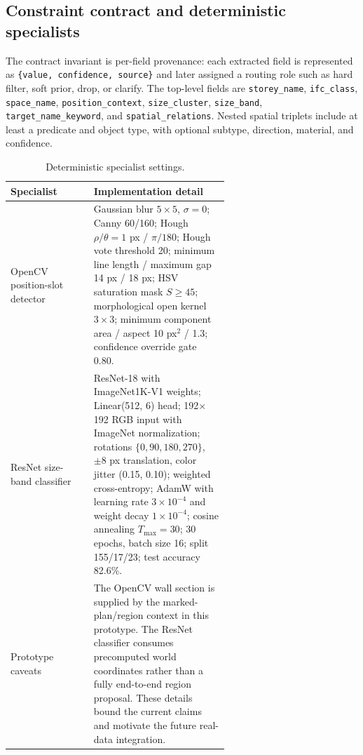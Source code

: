 \subsection{Constraint contract and deterministic specialists}
\label{app:contract}

The contract invariant is per-field provenance: each extracted field is represented as \texttt{\{value, confidence, source\}} and later assigned a routing role such as hard filter, soft prior, drop, or clarify. The top-level fields are \texttt{storey\_name}, \texttt{ifc\_class}, \texttt{space\_name}, \texttt{position\_context}, \texttt{size\_cluster}, \texttt{size\_band}, \texttt{target\_name\_keyword}, and \texttt{spatial\_relations}. Nested spatial triplets include at least a predicate and object type, with optional subtype, direction, material, and confidence.

\begin{table}[ht]
  \centering
  \small
  \begin{tabular}{lp{0.62\linewidth}}
    \toprule
    Specialist & Implementation detail \\
    \midrule
    OpenCV position-slot detector & Gaussian blur $5\times5$, $\sigma=0$; Canny 60/160; Hough $\rho/\theta=1$ px / $\pi/180$; Hough vote threshold 20; minimum line length / maximum gap 14 px / 18 px; HSV saturation mask $S\ge45$; morphological open kernel $3\times3$; minimum component area / aspect 10 px$^2$ / 1.3; confidence override gate 0.80. \\
    ResNet size-band classifier & ResNet-18 with ImageNet1K-V1 weights; Linear(512, 6) head; 192$\times$192 RGB input with ImageNet normalization; rotations $\{0,90,180,270\}$, $\pm8$ px translation, color jitter (0.15, 0.10); weighted cross-entropy; AdamW with learning rate $3\times10^{-4}$ and weight decay $1\times10^{-4}$; cosine annealing $T_{\max}=30$; 30 epochs, batch size 16; split 155/17/23; test accuracy 82.6\%. \\
    Prototype caveats & The OpenCV wall section is supplied by the marked-plan/region context in this prototype. The ResNet classifier consumes precomputed world coordinates rather than a fully end-to-end region proposal. These details bound the current claims and motivate the future real-data integration. \\
    \bottomrule
  \end{tabular}
  \caption{Deterministic specialist settings.}
  \label{tab:app-specialists}
\end{table}
\clearpage

